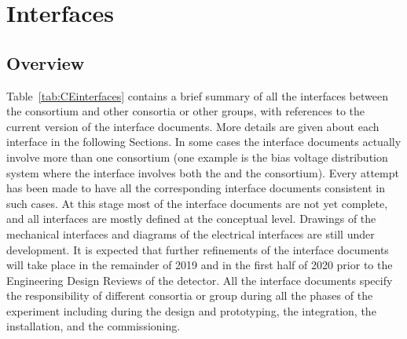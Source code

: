 \section{Interfaces}
\label{sec:fdsp-tpcelec-interfaces}

\subsection{Overview}
\label{sec:fdsp-tpcelec-interfaces-overview}

Table~\ref{tab:CEinterfaces} contains a brief summary of all the interfaces
between the  consortium and other consortia or other groups,
with references to the current version of the interface documents. More
details are given about each interface in the following Sections.
In some cases the interface documents actually involve more than one 
consortium (one example is the bias voltage distribution system where
the interface involves both the  and the  consortium).
Every attempt has been made to have all the corresponding interface documents 
consistent in such cases. At this stage most of the interface documents are
not yet complete, and all interfaces are mostly defined at the conceptual
level. Drawings of the mechanical interfaces and diagrams
of the electrical interfaces are still under development. It is expected 
that further refinements of the interface documents will take place in the
remainder of 2019 and in the first half of 2020 prior to the Engineering Design
Reviews of the detector. All the interface documents specify the responsibility
of different consortia or group during all the phases of the experiment
including during the design and prototyping, the integration, the installation,
and the commissioning.


